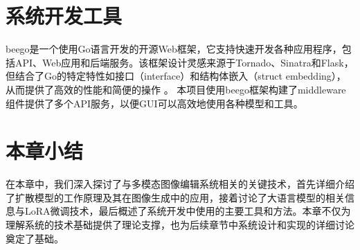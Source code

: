 \documentclass[a4paper,AutoFakeBold,oneside,12pt]{book}
\begin{document}
\section{系统开发工具}
beego是一个使用Go语言开发的开源Web框架，它支持快速开发各种应用程序，包括API、Web应用和后端服务。该框架设计灵感来源于Tornado、Sinatra和Flask，但结合了Go的特定特性如接口（interface）和结构体嵌入（struct embedding），从而提供了高效的性能和简便的操作​ 。
本项目使用beego框架构建了middleware组件提供了多个API服务，以便GUI可以高效地使用各种模型和工具。

\section{本章小结}
在本章中，我们深入探讨了与多模态图像编辑系统相关的关键技术，首先详细介绍了扩散模型的工作原理及其在图像生成中的应用，接着讨论了大语言模型的相关信息与LoRA微调技术，最后概述了系统开发中使用的主要工具和方法。本章不仅为理解系统的技术基础提供了理论支撑，也为后续章节中系统设计和实现的详细讨论奠定了基础。






\end{document}
